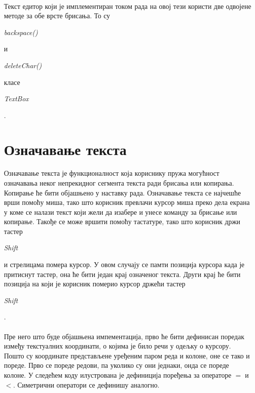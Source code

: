 \documentclass[12pt,oneside]{memoir}
\begin{document}
\paragraph{}
Текст едитор који је имплементиран током рада на овој тези користи две одвојене
методе за обе врсте брисања. То су 
\begin{latinica}\textit{backspace()} \end{latinica} и
\begin{latinica}\textit{deleteChar()} \end{latinica} класе
\begin{latinica}\textit{TextBox} \end{latinica}.

\section{Означавање текста}
\paragraph{}
Означавање текста је функционалност која кориснику пружа могућност означавања
неког непрекидног сегмента текста ради брисања или копирања. Копирање ће бити
објашњено у наставку рада. Означавање текста се најчешће врши помоћу миша, тако што корисник превлачи курсор миша преко дела екрана у коме се налази текст који жели да изабере
и унесе команду за брисање или копирање. Такође се може вршити помоћу тастатуре, тако што
корисник држи тастер \begin{latinica}\textit{Shift}\end{latinica} и стрелицама помера курсор. У овом случају се памти позиција курсора када је притиснут тастер, она ће бити
један крај означеног текста. Други крај ће бити позиција на који је корисник померио
курсор држећи тастер \begin{latinica}\textit{Shift}\end{latinica}.

\paragraph{}
Пре него што буде објашњена импементација, прво ће бити дефинисан поредак између текстуалних координати, о којима је било речи у одељку о курсору. Пошто су координате
представљене уређеним паром реда и колоне,  оне се тако и пореде. Прво се пореде редови, 
па уколико су они једнаки, онда се пореде колоне. У следећем коду илустрована је дефиниција
поређења за операторе \(=\) и \(<\). Симетрични оператори се дефинишу аналогно.
\end{document}
